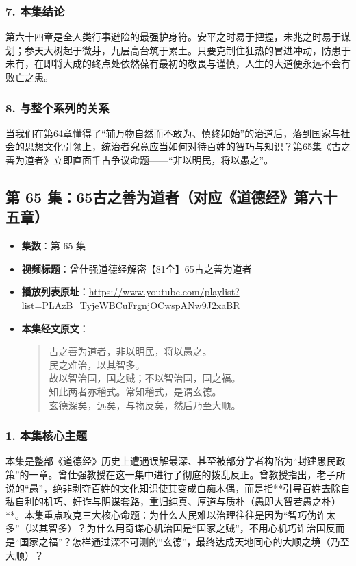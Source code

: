 \subsubsection{7. 本集结论}
第六十四章是全人类行事避险的最强护身符。安平之时易于把握，未兆之时易于谋划；参天大树起于微芽，九层高台筑于累土。只要克制住狂热的冒进冲动，防患于未有，在即将大成的终点处依然葆有最初的敬畏与谨慎，人生的大道便永远不会有败亡之患。

\subsubsection{8. 与整个系列的关系}
当我们在第64章懂得了“辅万物自然而不敢为、慎终如始”的治道后，落到国家与社会的思想文化引领上，统治者究竟应当如何对待百姓的智巧与知识？第65集《古之善为道者》立即直面千古争议命题——“非以明民，将以愚之”。

\clearpage

\subsection{第 65 集：65古之善为道者（对应《道德经》第六十五章）}
\label{sec:ep65}

\begin{itemize}
    \item \textbf{集数}：第 65 集
    \item \textbf{视频标题}：曾仕强道德经解密【81全】65古之善为道者
    \item \textbf{播放列表原址}：\url{https://www.youtube.com/playlist?list=PLAzB_TyjeWBCuFrgnjOCwspANw9J2xaBR}
    \item \textbf{本集经文原文}：
    \begin{quote}\kaishu
    古之善为道者，非以明民，将以愚之。\\
    民之难治，以其智多。\\
    故以智治国，国之贼；不以智治国，国之福。\\
    知此两者亦稽式。常知稽式，是谓玄德。\\
    玄德深矣，远矣，与物反矣，然后乃至大顺。
    \end{quote}
\end{itemize}

\subsubsection{1. 本集核心主题}
本集是整部《道德经》历史上遭遇误解最深、甚至被部分学者构陷为“封建愚民政策”的一章。曾仕强教授在这一集中进行了彻底的拨乱反正。曾教授指出，老子所说的“愚”，绝非剥夺百姓的文化知识使其变成白痴木偶，而是指**引导百姓去除自私自利的机巧、奸诈与阴谋套路，重归纯真、厚道与质朴（愚即大智若愚之朴）**。本集重点攻克三大核心命题：为什么人民难以治理往往是因为“智巧伪诈太多”（以其智多）？为什么用奇谋心机治国是“国家之贼”，不用心机巧诈治国反而是“国家之福”？怎样通过深不可测的“玄德”，最终达成天地同心的大顺之境（乃至大顺）？

